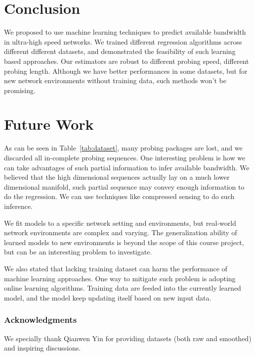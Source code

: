\section{Conclusion}
\label{sec:conclusion}
We proposed to use machine learning techniques to predict available bandwidth
in ultra-high speed networks. We trained different regression algorithms across
different different datasets, and demonstrated the feasibility of such learning
based approaches. Our estimators are robust to different probing speed,
different probing length. Although we have better performances in some
datasets, but for new network environments without training data, such methods
won't be promising.

\section{Future Work}
\label{sec:future_work}
As can be seen in Table~\ref{tab:dataset}, many probing packages are lost, and
we discarded all in-complete probing sequences. One interesting problem is how
we can take advantages of such partial information to infer available
bandwidth. We believed that the high dimensional sequences actually lay on a
much lower dimensional manifold, such partial sequence may convey enough
information to do the regression. We can use techniques like compressed
sensing\cite{donoho2006compressed} to do such inference.

We fit models to a specific network setting and environments, but real-world
network environments are complex and varying. The generalization ability of
learned models to new environments is beyond the scope of this course project,
but can be an interesting problem to investigate.

We also stated that lacking training dataset can harm the performance of
machine learning approaches. One way to mitigate such problem is adopting
online learning algorithms. Training data are feeded into the currently learned
model, and the model keep updating itself based on new input data.

\subsubsection*{Acknowledgments}

We specially thank Qianwen Yin for providing datasets (both raw and smoothed)
and inspiring discussions.
